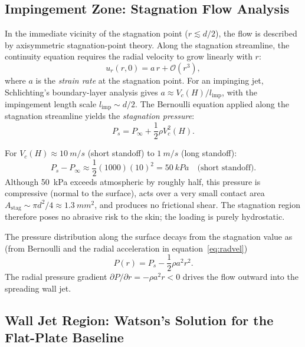 \documentclass[aps,prfluids,reprint,amsmath,amssymb,floatfix]{revtex4-2}
\begin{document}
\subsection{Impingement Zone: Stagnation Flow Analysis}
\label{subsec:stagnation}

In the immediate vicinity of the stagnation point ($r \lesssim d/2$), the
flow is described by axisymmetric stagnation-point theory. Along the
stagnation streamline, the continuity equation requires the radial velocity
to grow linearly with $r$:
\begin{equation}
    u_r(r, 0) = a\,r + \mathcal{O}(r^3),
    \label{eq:radvel}
\end{equation}
where $a$ is the \emph{strain rate} at the stagnation point. For an
impinging jet, Schlichting's boundary-layer analysis gives
$a \approx V_c(H) / l_\mathrm{imp}$, with the impingement length scale
$l_\mathrm{imp} \sim d/2$. The Bernoulli equation applied along the
stagnation streamline yields the \emph{stagnation pressure}:
\begin{equation}
    P_s = P_\infty + \frac{1}{2}\rho V_c^2(H).
    \label{eq:stagpress}
\end{equation}

For $V_c(H) \approx \SI{10}{m/s}$ (short standoff) to $\SI{1}{m/s}$ (long standoff):
\begin{equation}
    P_s - P_\infty \approx \frac{1}{2}(1000)(10)^2 = \SI{50}{kPa}
    \quad \text{(short standoff)}.
    \label{eq:stagval}
\end{equation}
Although \SI{50}{kPa} exceeds atmospheric by roughly half, this pressure
is compressive (normal to the surface), acts over a very small contact area
$A_\mathrm{stag} \sim \pi d^2/4 \approx \SI{1.3}{mm^2}$, and produces no
frictional shear. The stagnation region therefore poses no abrasive risk to
the skin; the loading is purely hydrostatic.

The pressure distribution along the surface decays from the stagnation value
as (from Bernoulli and the radial acceleration in equation~\ref{eq:radvel})
\begin{equation}
    P(r) = P_s - \frac{1}{2}\rho a^2 r^2.
    \label{eq:pressuredist}
\end{equation}
The radial pressure gradient $\partial P/\partial r = -\rho a^2 r < 0$
drives the flow outward into the spreading wall jet.

\subsection{Wall Jet Region: Watson's Solution for the Flat-Plate Baseline}
\label{subsec:watson}
\end{document}
